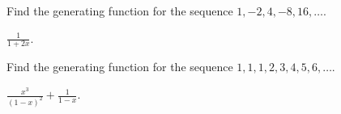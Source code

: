 \begin{questions}

	\begin{answer}
	\end{answer}





\question Find the generating function for the sequence $1, -2, 4, -8, 16, \ldots$.

	\begin{answer}
		$\frac{1}{1+2x}$.
	\end{answer}




\question Find the generating function for the sequence $1, 1, 1, 2, 3, 4, 5, 6, \ldots$.

	\begin{answer}
		$\frac{x^3}{(1-x)^2} + \frac{1}{1-x}$.
	\end{answer}






\end{questions}

